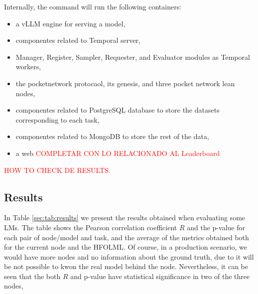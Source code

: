 Internally, the command will run the following containers:

\begin{itemize}[noitemsep]
    \item a vLLM \cite{kwon_efficient_2023} engine for serving a model,
    \item componentes related to Temporal server,
    \item Manager, Register, Sampler, Requester, and Evaluator modules as Temporal workers,
    \item the pocketnetwork protocaol, its genesis, and three pocket network lean nodes,
    \item componentes related to PostgreSQL database to store the datasets corresponding to each task,
    \item componentes related to MongoDB to store the rest of the data, 
    \item a web \textcolor{red}{COMPLETAR CON LO RELACIONADO AL Leaderboard} 
\end{itemize}

\textcolor{red}{HOW TO CHECK DE RESULTS.}


\subsection{Results}

In Table \ref{sec:tab:results} we present the results obtained when evaluating some \glspl{LM}. 
The table shows the Pearson correlation coefficient $R$ and the p-value for each pair of node/model and task, and the average of the metrics obtained both for the current node and the \gls{HFOLML}. 
Of course, in a production scenario, we would have more nodes and no information about the ground truth, due to it will be not possible to kwon the real model behind the node. 
Nevertheless, it can be seen that the both $R$ and p-value have statistical significance in two of the three nodes, 

